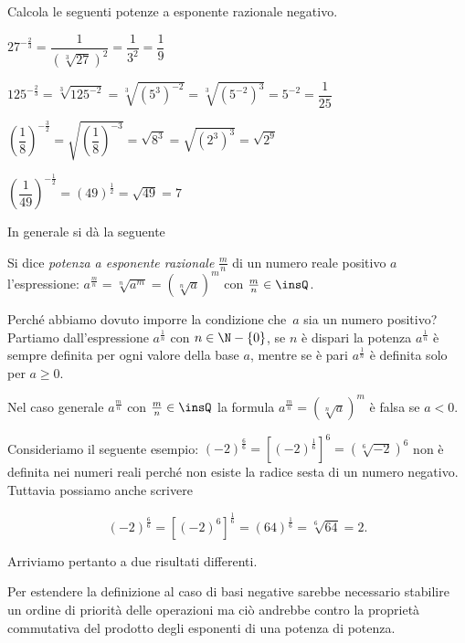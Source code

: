 \begin{exrig}
\begin{esempio}
 Calcola le seguenti potenze a esponente razionale negativo.
 \begin{itemize*}
 \item \(27^{-\frac 2 3}=\dfrac 1{\left(\sqrt[3]{27}\right)^2}=
   \dfrac 1{3^2}=\dfrac 1 9\)
 \item \(125^{-\frac 2 3}=\sqrt[3]{125^{-2}}=\sqrt[3]{(5^3)^{-2}}=
   \sqrt[3]{(5^{-2})^3}=5^{-2}=\dfrac 1{25}\)
 \item \(\left(\dfrac 1 8\right)^{-\frac 3 2}=
   \sqrt{\left(\dfrac 1 8\right)^{-3}}=\sqrt{8^3}=\sqrt{(2^3)^3}=\sqrt{2^9}\)
 \item \(\left(\dfrac 1{49}\right)^{-\frac 1 2}=(49)^{\frac 1 2}=\sqrt{49}=7\)
\end{itemize*}
\end{esempio}
\end{exrig}

In generale si dà la seguente
\begin{definizione}
Si dice \emph{potenza a esponente razionale} \(\frac m n\) di un numero reale 
positivo \(a\) l'espressione:
 \(a^{\frac m n}=\sqrt[n]{a^m}=\left(\sqrt[n]a\right)^m\) con 
 \(\frac m n\in \insQ\).
\end{definizione}

Perché abbiamo dovuto imporre la condizione che~\(a\) sia un numero positivo?
Partiamo dall'espressione \(a^{\frac 1 n}\) con \(n\in \N-\{0\}\), 
se \(n\) è dispari la potenza \(a^{\frac 1 n}\) è sempre definita per ogni 
valore 
della base \(a\), mentre se è pari \(a^{\frac 1 n}\) è definita solo 
per \(a{\geq}0\).

Nel caso generale \(a^{\frac m n}\) con \(\frac m n\in \insQ\) 
la formula \(a^{\frac m n}=\left(\sqrt[n]a\right)^m\) è falsa se \(a<0\).

Consideriamo il seguente esempio:
\((-2)^{\frac 6 6}=\left[(-2)^{\frac 1 
6}\right]^6=\left(\sqrt[6]{-2}\right)^6\) 
non è definita nei numeri reali perché non esiste la radice sesta di un 
numero 
negativo.
Tuttavia possiamo anche scrivere 

\[(-2)^{\frac 6 6}=\left[(-2)^6\right]^{\frac 1 6}=(64)^{\frac 1 6}=
\sqrt[6]{64}=2.\]

Arriviamo pertanto a due risultati differenti.

Per estendere la definizione al caso di basi negative sarebbe necessario 
stabilire un ordine di priorità delle operazioni ma ciò andrebbe contro la 
proprietà commutativa del prodotto degli esponenti di una potenza di potenza.

